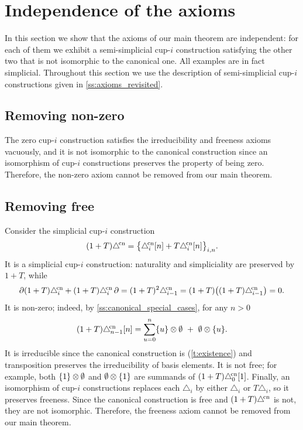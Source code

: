 
\section{Independence of the axioms}\label{s:examples}

In this section we show that the axioms of our main theorem are independent: for each of them we exhibit a semi-simplicial \mbox{cup-$i$} construction satisfying the other two that is not isomorphic to the canonical one.
All examples are in fact simplicial.
Throughout this section we use the description of semi-simplicial \mbox{cup-$i$} constructions given in \cref{ss:axioms_revisited}.

\subsection{Removing non-zero}

The zero \mbox{cup-$i$} construction satisfies the irreducibility and freeness axioms vacuously, and it is not isomorphic to the canonical construction since an isomorphism of \mbox{cup-$i$} constructions preserves the property of being zero.
Therefore, the non-zero axiom cannot be removed from our main theorem.

\subsection{Removing free}\label{ss:non_free}

Consider the simplicial \mbox{cup-$i$} construction
\[
(1+T)\canonical = \set[\big]{\canonical_i[n] + T\canonical_i[n]}_{i,n}.
\]
It is a simplicial \mbox{cup-$i$} construction: naturality and simpliciality are preserved by $1+T$, while
\[
	\bd(1+T)\canonical_i + (1+T)\canonical_i\bd
	= (1+T)^2\canonical_{i-1}
	= (1+T)\big((1+T)\canonical_{i-1}\big) = 0.
\]
It is non-zero; indeed, by \cref{ss:canonical_special_cases}, for any $n > 0$
\[
(1+T)\canonical_{n-1}[n] = \sum_{u=0}^{n} \set{u} \ot \emptyset \ + \ \emptyset \ot \set{u}.
\]
It is irreducible since the canonical construction is (\cref{t:existence}) and transposition preserves the irreducibility of basis elements.
It is not free; for example, both $\set{1} \ot \emptyset$ and $\emptyset \ot \set{1}$ are summands of $(1+T)\canonical_0[1]$.
Finally, an isomorphism of \mbox{cup-$i$} constructions replaces each $\triangle_i$ by either $\triangle_i$ or $T\triangle_i$, so it preserves freeness.
Since the canonical construction is free and $(1+T)\canonical$ is not, they are not isomorphic.
Therefore, the freeness axiom cannot be removed from our main theorem.

